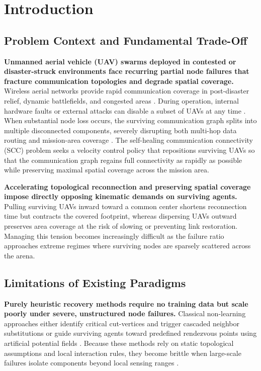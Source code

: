 \documentclass[11pt]{article}
\theoremstyle{plain}
\theoremstyle{definition}
\theoremstyle{remark}
\begin{document}
\section{Introduction}
\label{sec:intro}

\subsection{Problem Context and Fundamental Trade-Off}
\textbf{Unmanned aerial vehicle (UAV) swarms deployed in contested or disaster-struck environments face recurring partial node failures that fracture communication topologies and degrade spatial coverage.} Wireless aerial networks provide rapid communication coverage in post-disaster relief, dynamic battlefields, and congested areas \citep{coletta2023auav,shi2025symmetry,wang2022task,wang2024angle}. During operation, internal hardware faults or external attacks can disable a subset of UAVs at any time \citep{wang2024survey,kurunathan2023machine}. When substantial node loss occurs, the surviving communication graph splits into multiple disconnected components, severely disrupting both multi-hop data routing and mission-area coverage \citep{li2023reinforcement,peng2022smarttro}. The self-healing communication connectivity (SCC) problem seeks a velocity control policy that repositions surviving UAVs so that the communication graph regains full connectivity as rapidly as possible while preserving maximal spatial coverage across the mission area.

\textbf{Accelerating topological reconnection and preserving spatial coverage impose directly opposing kinematic demands on surviving agents.} Pulling surviving UAVs inward toward a common center shortens reconnection time but contracts the covered footprint, whereas dispersing UAVs outward preserves area coverage at the risk of slowing or preventing link restoration. Managing this tension becomes increasingly difficult as the failure ratio approaches extreme regimes where surviving nodes are sparsely scattered across the arena.

\subsection{Limitations of Existing Paradigms}
\textbf{Purely heuristic recovery methods require no training data but scale poorly under severe, unstructured node failures.} Classical non-learning approaches either identify critical cut-vertices and trigger cascaded neighbor substitutions \citep{akkaya2009distributed,mi2015obstacle,zhang2024uavenabled} or guide surviving agents toward predefined rendezvous points using artificial potential fields \citep{joshi2012autonomous,shriwastav2018roundtable,chen2020sidr,wang2024apfcpp}. Because these methods rely on static topological assumptions and local interaction rules, they become brittle when large-scale failures isolate components beyond local sensing ranges \citep{tosun2024dpkcr}.
\end{document}
